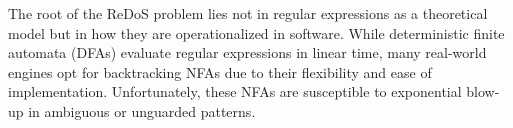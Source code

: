 The root of the ReDoS problem lies not in regular expressions as a theoretical model but in how they are operationalized in software. While deterministic finite automata (DFAs) evaluate regular expressions in linear time, many real-world engines opt for backtracking NFAs due to their flexibility and ease of implementation. Unfortunately, these NFAs are susceptible to exponential blow-up in ambiguous or unguarded patterns.

\section{}